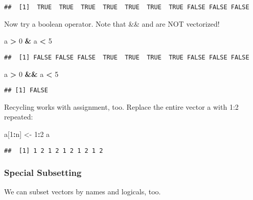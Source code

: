 \documentclass[]{article}
\newenvironment{Shaded}{\begin{snugshade}}{\end{snugshade}}
\newcommand{\DecValTok}[1]{\textcolor[rgb]{0.00,0.00,0.81}{#1}}
\newcommand{\StringTok}[1]{\textcolor[rgb]{0.31,0.60,0.02}{#1}}
\newcommand{\OperatorTok}[1]{\textcolor[rgb]{0.81,0.36,0.00}{\textbf{#1}}}
\newcommand{\NormalTok}[1]{#1}
\begin{document}
\begin{verbatim}
##  [1]  TRUE  TRUE  TRUE  TRUE  TRUE  TRUE  TRUE FALSE FALSE FALSE
\end{verbatim}

Now try a boolean operator. Note that \&\& and \textbar{}\textbar{} are
NOT vectorized!

\begin{Shaded}
\begin{Highlighting}[]
\NormalTok{a }\OperatorTok{>}\StringTok{ }\DecValTok{0} \OperatorTok{&}\StringTok{ }\NormalTok{a }\OperatorTok{<}\StringTok{ }\DecValTok{5}
\end{Highlighting}
\end{Shaded}

\begin{verbatim}
##  [1] FALSE FALSE FALSE  TRUE  TRUE  TRUE  TRUE FALSE FALSE FALSE
\end{verbatim}

\begin{Shaded}
\begin{Highlighting}[]
\NormalTok{a }\OperatorTok{>}\StringTok{ }\DecValTok{0} \OperatorTok{&&}\StringTok{ }\NormalTok{a }\OperatorTok{<}\StringTok{ }\DecValTok{5}
\end{Highlighting}
\end{Shaded}

\begin{verbatim}
## [1] FALSE
\end{verbatim}

Recycling works with assignment, too. Replace the entire vector a with
1:2 repeated:

\begin{Shaded}
\begin{Highlighting}[]
\NormalTok{a[}\DecValTok{1}\OperatorTok{:}\NormalTok{n] <-}\StringTok{ }\DecValTok{1}\OperatorTok{:}\DecValTok{2}
\NormalTok{a}
\end{Highlighting}
\end{Shaded}

\begin{verbatim}
##  [1] 1 2 1 2 1 2 1 2 1 2
\end{verbatim}

\subsubsection{Special Subsetting}\label{special-subsetting}

We can subset vectors by names and logicals, too.
\end{document}
